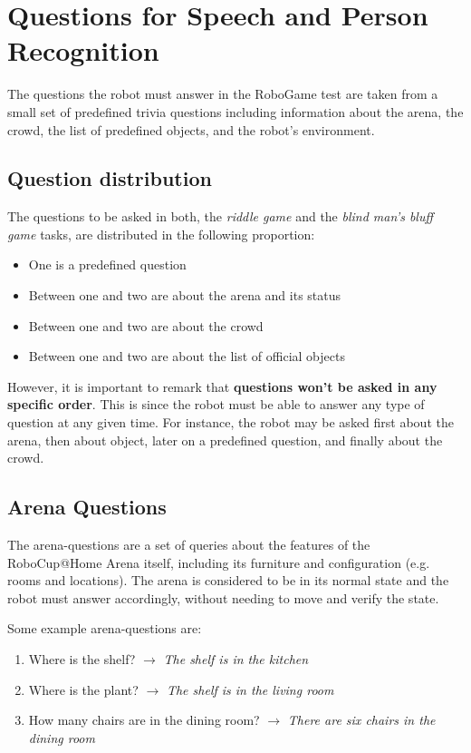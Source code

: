 \chapter{Questions for Speech and Person Recognition}
\label{chap:robogame-appendix}

The questions the robot must answer in the RoboGame test are taken from a small set of predefined trivia questions including information about the arena, the crowd, the list of predefined objects, and the robot's environment.

\section{Question distribution}
The questions to be asked in both, the \textit{riddle game} and the \textit{blind man's bluff game} tasks, are distributed in the following proportion:
\begin{itemize}
    \item One is a predefined question
    \item Between one and two are about the arena and its status
    \item Between one and two are about the crowd
    \item Between one and two are about the list of official objects
\end{itemize}
However, it is important to remark that \textbf{questions won't be asked in any specific order}. This is since the robot must be able to answer any type of question at any given time. For instance, the robot may be asked first about the arena, then about object, later on a predefined question, and finally about the crowd.

\section{Arena Questions}
The arena-questions are a set of queries about the features of the RoboCup@Home Arena itself, including its furniture and configuration (e.g. rooms and locations). The arena is considered to be in its normal state and the robot must answer accordingly, without needing to move and verify the state.

Some example arena-questions are:
\begin{enumerate}
    \item Where is the shelf? $\rightarrow$ \textit{The shelf is in the kitchen}
    \item Where is the plant? $\rightarrow$ \textit{The shelf is in the living room}
    \item How many chairs are in the dining room? $\rightarrow$ \textit{There are six chairs in the dining room}
\end{enumerate}

